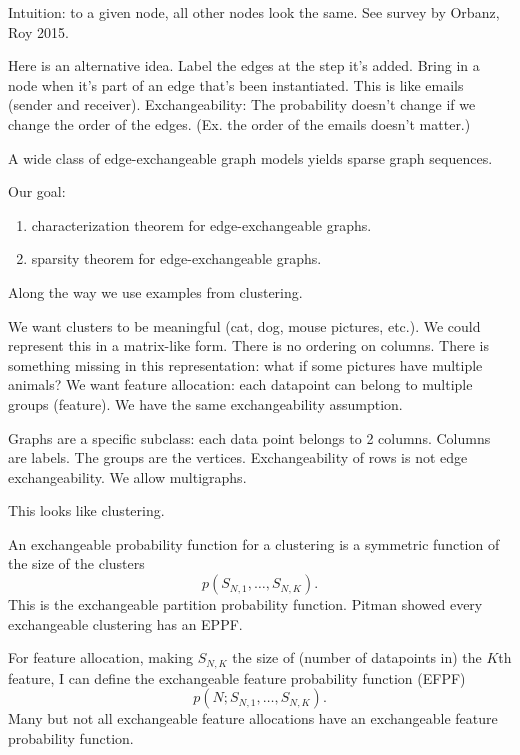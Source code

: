Intuition: to a given node, all other nodes look the same.
See survey by Orbanz, Roy 2015. 

Here is an alternative idea. Label the edges at the step it's added. Bring in a node when it's part of an edge that's been instantiated. This is like emails (sender and receiver). Exchangeability: The probability doesn't change if we change the order of the edges.
 (Ex. the order of the emails doesn't matter.) 

\begin{thm}[CCB]
A wide class of edge-exchangeable graph models yields sparse graph sequences.
\end{thm}
Our goal:
\begin{enumerate}
\item
characterization theorem for edge-exchangeable graphs.
\item
sparsity theorem for edge-exchangeable graphs.
\end{enumerate}

Along the way we use examples from clustering.

We want clusters to be meaningful (cat, dog, mouse pictures, etc.). We could represent this in a matrix-like form. There is no ordering on columns.
There is something missing in this representation: what if some pictures have multiple animals? We want feature allocation: each datapoint can belong to multiple groups (feature). We have the same exchangeability assumption. %

Graphs are a specific subclass: each data point belongs to 2 columns. Columns are labels. The groups are the vertices. Exchangeability of rows is not edge exchangeability. %
We allow multigraphs.

This looks like clustering. 

An exchangeable probability function for a clustering is a symmetric function of the size of the clusters
$$p(S_{N,1},\ldots, S_{N,K}).$$
This is the exchangeable partition probability function.
Pitman showed every exchangeable clustering has an EPPF.

For feature allocation, making $S_{N,K}$ the size of (number of datapoints in) the $K$th feature, I can define the exchangeable feature probability function (EFPF)
$$
p(N;S_{N,1},\ldots, S_{N,K}).
$$
Many but not all exchangeable feature allocations have an exchangeable feature probability function. 


